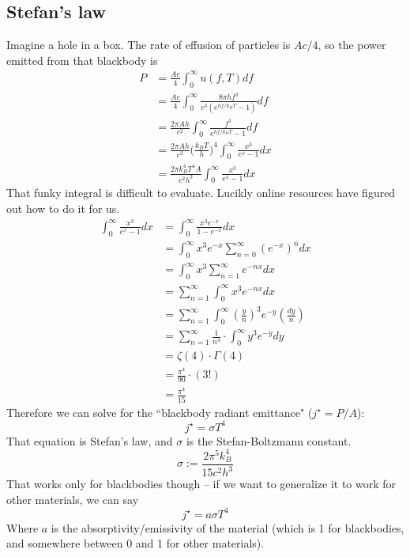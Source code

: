 \documentclass[12pt]{article}
\begin{document}
\subsection{Stefan's law}
Imagine a hole in a box. The rate of effusion of particles is $A c / 4$, so the power emitted from that blackbody is
\begin{align*}
    P &= \frac{A c}{4} \int_0^\infty u(f, T) df \\
      &= \frac{A c}{4} \int_0^\infty \frac{8 \pi h f^3}{c^3 (e^{hf/k_B T} - 1)}  df \\
      &= \frac{2 \pi A h}{c^2} \int_0^\infty \frac{f^3}{e^{hf/k_B T} - 1} df \\
      &= \frac{2 \pi A h}{c^2} \Bigg( \frac{k_B T}{h} \Bigg)^4 \int_0^\infty \frac{x^3}{e^x - 1} dx \\
      &= \frac{2 \pi k_B^4 T^4 A}{c^2 h^3} \int_0^\infty \frac{x^3}{e^x - 1} dx
\end{align*}
That funky integral is difficult to evaluate. Lucikly online resources have figured out how to do it for us.
\begin{align*}
    \int_0^\infty \frac{x^3}{e^x - 1} dx &= \int_0^\infty \frac{x^3 e^{-x}}{1 - e^{-x}} dx \\
    &= \int_0^\infty x^3 e^{-x} \sum_{n=0}^\infty (e^{-x})^n dx \\
    &= \int_0^\infty x^3 \sum_{n=1}^\infty e^{-nx} dx \\
    &= \sum_{n=1}^\infty \int_0^\infty x^3 e^{-nx} dx \\
    &= \sum_{n=1}^\infty \int_0^\infty \left( \frac{y}{n} \right)^3 e^{-y} \left( \frac{dy}{n} \right) \\
    &= \sum_{n=1}^\infty \frac{1}{n^4} \cdot \int_0^\infty y^3 e^{-y} dy \\
    &= \zeta(4) \cdot \Gamma(4) \\
    &= \frac{\pi^4}{90} \cdot (3!) \\
    &= \frac{\pi^4}{15}
\end{align*}
Therefore we can solve for the ``blackbody radiant emittance" ($j^\star = P / A$):
\[ j^\star = \sigma T^4 \]
That equation is Stefan's law, and $\sigma$ is the Stefan-Boltzmann constant.
\[ \sigma := \frac{2 \pi^5 k_B^4}{15 c^2 h^3} \]
That works only for blackbodies though -- if we want to generalize it to work for other materials, we can say
\[ j^\star = a \sigma T^4 \]
Where $a$ is the absorptivity/emissivity of the material (which is 1 for blackbodies, and somewhere between 0 and 1 for other materials).
\end{document}
